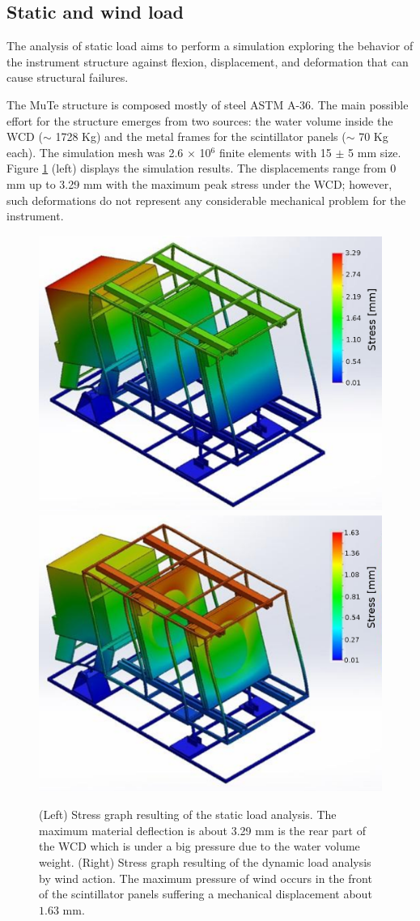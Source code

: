 \documentclass[letterpaper,11pt]{article}
\begin{document}
\subsection{Static and wind load}
The analysis of static load aims to perform a simulation exploring the behavior of the instrument structure against flexion, displacement, and deformation that can cause structural failures. 

The MuTe structure is composed mostly of steel ASTM A-36. The main possible effort for the structure emerges from two sources: the water volume inside the WCD ($\sim$ 1728 Kg) and the metal frames for the scintillator panels ($\sim$ 70 Kg each). The simulation mesh was 2.6 $\times$ 10$^6$ finite elements with 15 $\pm$ 5 mm size. Figure \ref{fig:stress} (left) displays the simulation results. The displacements range from  0 mm up to 3.29 mm with the maximum peak stress under the WCD; however, such deformations do not represent any considerable mechanical problem for the instrument.

\begin{figure}[htb]
\centering
\includegraphics[width=0.48\columnwidth]{Figures/stress_graph.eps}
\includegraphics[width=0.48\columnwidth]{Figures/stress_graph_wind.eps}
\caption{(Left) Stress graph resulting of the static load analysis. The maximum material deflection is about 3.29 mm is the rear part of the WCD which is under a big pressure due to the water volume weight. (Right) Stress graph resulting of the dynamic load analysis by wind action. The maximum pressure of wind occurs in the front of the scintillator panels suffering a mechanical displacement about $1.63$ mm.}
\label{fig:stress}
\end{figure}
\end{document}
